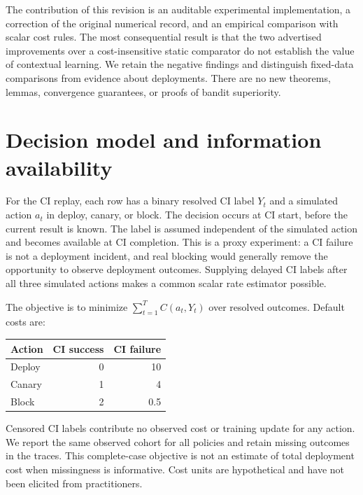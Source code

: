 \documentclass[
  10pt,
]{article}
\begin{document}
The contribution of this revision is an auditable experimental
implementation, a correction of the original numerical record, and an
empirical comparison with scalar cost rules. The most consequential
result is that the two advertised improvements over a cost-insensitive
static comparator do not establish the value of contextual learning. We
retain the negative findings and distinguish fixed-data comparisons from
evidence about deployments. There are no new theorems, lemmas,
convergence guarantees, or proofs of bandit superiority.

\section{Decision model and information
availability}\label{decision-model-and-information-availability}

For the CI replay, each row has a binary resolved CI label \(Y_t\) and a
simulated action \(a_t\) in deploy, canary, or block. The decision
occurs at CI start, before the current result is known. The label is
assumed independent of the simulated action and becomes available at CI
completion. This is a proxy experiment: a CI failure is not a deployment
incident, and real blocking would generally remove the opportunity to
observe deployment outcomes. Supplying delayed CI labels after all three
simulated actions makes a common scalar rate estimator possible.

The objective is to minimize \(\sum_{t=1}^{T} C(a_t,Y_t)\) over resolved
outcomes. Default costs are:

\par\medskip\noindent\begin{minipage}{\linewidth}\centering
\begin{tabular}{@{}lrr@{}}
\toprule\noalign{}
Action & CI success & CI failure \\
\midrule\noalign{}
Deploy & 0 & 10 \\
Canary & 1 & 4 \\
Block & 2 & 0.5 \\
\bottomrule
\end{tabular}
\end{minipage}\par\medskip

Censored CI labels contribute no observed cost or training update for
any action. We report the same observed cohort for all policies and
retain missing outcomes in the traces. This complete-case objective is
not an estimate of total deployment cost when missingness is
informative. Cost units are hypothetical and have not been elicited from
practitioners.
\end{document}
